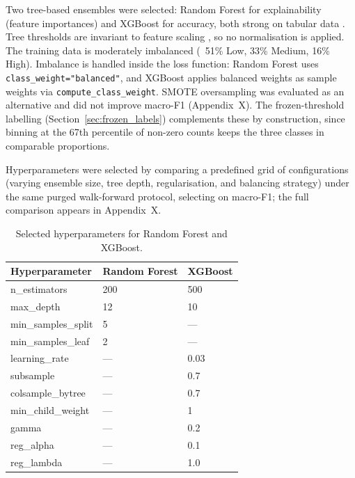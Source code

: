 Two tree-based ensembles were selected: Random Forest for explainability (feature importances) and XGBoost for accuracy, both strong on tabular data \cite{shwartz-ziv_tabular_2022}. Tree thresholds are invariant to feature scaling \cite{breiman2001random}, so no normalisation is applied. The training data is moderately imbalanced (~51\% Low, 33\% Medium, 16\% High). Imbalance is handled inside the loss function: Random Forest uses \texttt{class\_weight="balanced"}, and XGBoost applies balanced weights as sample weights via \texttt{compute\_class\_weight}. SMOTE oversampling \cite{chawla_smote_2002} was evaluated as an alternative and did not improve macro-F1 (Appendix~X). The frozen-threshold labelling (Section~\ref{sec:frozen_labels}) complements these by construction, since binning at the 67th percentile of non-zero counts keeps the three classes in comparable proportions.

Hyperparameters were selected by comparing a predefined grid of configurations (varying ensemble size, tree depth, regularisation, and balancing strategy) under the same purged walk-forward protocol, selecting on macro-F1; the full comparison appears in Appendix~X. %

\begin{table}[htbp]
    \centering
    \caption{Selected hyperparameters for Random Forest and XGBoost.}
    \label{tab:hyperparameters}
    \begin{tabular}{p{4cm}p{3.5cm}p{3cm}}
        \toprule
        \textbf{Hyperparameter} & \textbf{Random Forest} & \textbf{XGBoost} \\
        \midrule
        n\_estimators & 200 & 500 \\
        max\_depth & 12 & 10 \\
        min\_samples\_split & 5 & --- \\
        min\_samples\_leaf & 2 & --- \\
        learning\_rate & --- & 0.03 \\
        subsample & --- & 0.7 \\
        colsample\_bytree & --- & 0.7 \\
        min\_child\_weight & --- & 1 \\
        gamma & --- & 0.2 \\
        reg\_alpha & --- & 0.1 \\
        reg\_lambda & --- & 1.0 \\
        \bottomrule
    \end{tabular}
\end{table}

